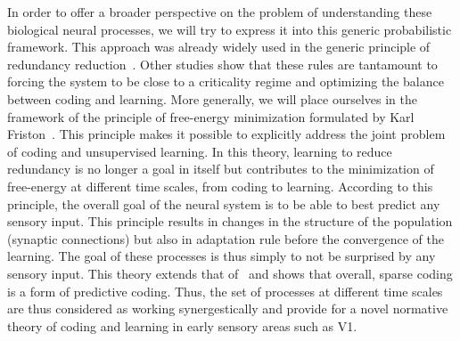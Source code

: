 \documentclass[a4paper, 11pt, draft]{article} %
\begin{document}
In order to offer a broader perspective on the problem of understanding these biological neural processes, we will try to express it into this generic probabilistic framework. This approach was already widely used in the generic principle of redundancy reduction~\citep{Atick92}. %
Other studies show that these rules are tantamount to forcing the system to be close to a criticality regime and optimizing the balance between coding and learning. %
More generally, we will place ourselves in the framework of the principle of free-energy minimization formulated by Karl Friston~\citep{Friston12}. This principle makes it possible to explicitly address the joint problem of coding and unsupervised learning. In this theory, learning to reduce redundancy is no longer a goal in itself but contributes to the minimization of free-energy at different time scales, from coding to learning. According to this principle, the overall goal of the neural system is to be able to best predict any sensory input. This principle results in changes in the structure of the population (synaptic connections) but also in adaptation rule before the convergence of the learning. The goal of these processes is thus simply to not be surprised by any sensory input. This theory extends that of~\citep{Olshausen97} and shows that overall, sparse coding is a form of predictive coding. Thus, the set of processes at different time scales are thus considered as working synergestically and provide for a novel normative theory of coding and learning in early sensory areas such as V1.
\end{document}
